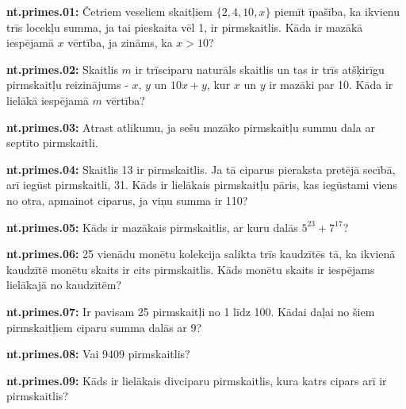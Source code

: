 \documentclass[11pt]{article}
\newenvironment{uzdevums}[1][\unskip]{%
\vspace{3mm}
\noindent
\textbf{#1:}
\noindent}
{}
\begin{document}
\begin{uzdevums}[nt.primes.01]
Četriem veseliem skaitļiem $\{2,4,10,x\}$ piemīt īpašība, ka ikvienu trīs locekļu summa, ja tai pieskaita vēl 1, ir pirmskaitlis. 
Kāda ir mazākā iespējamā $x$ vērtība, ja zināms, ka $x > 10$?  
\end{uzdevums}

\begin{uzdevums}[nt.primes.02]
Skaitlis $m$ ir trīsciparu naturāls skaitlis un tas ir trīs atšķirīgu pirmskaitļu reizinājums - $x$, $y$ un $10x+y$, 
kur $x$ un $y$ ir mazāki par 10. Kāda ir lielākā iespējamā $m$ vērtība?
\end{uzdevums}

\begin{uzdevums}[nt.primes.03]
Atrast atlikumu, ja sešu mazāko pirmskaitļu summu dala ar septīto pirmskaitli. 
\end{uzdevums}

\begin{uzdevums}[nt.primes.04]
Skaitlis 13 ir pirmskaitlis. Ja tā ciparus pieraksta pretējā secībā, arī iegūst pirmskaitli, 31. Kāds ir lielākais pirmskaitļu 
pāris, kas iegūstami viens no otra, apmainot ciparus, ja viņu summa ir 110? 
\end{uzdevums}

\begin{uzdevums}[nt.primes.05]
Kāds ir mazākais pirmskaitlis, ar kuru dalās $5^{23} + 7^{17}$?
\end{uzdevums}

\begin{uzdevums}[nt.primes.06]
25 vienādu monētu kolekcija salikta trīs kaudzītēs tā, ka ikvienā kaudzītē monētu skaits ir cits pirmskaitlis. Kāds monētu 
skaits ir iespējams lielākajā no kaudzītēm? 
\end{uzdevums}

\begin{uzdevums}[nt.primes.07]
Ir pavisam 25 pirmskaitļi no 1 līdz 100. Kādai daļai no šiem pirmskaitļiem ciparu summa dalās ar 9?
\end{uzdevums}

\begin{uzdevums}[nt.primes.08]
Vai 9409 pirmskaitlis?
\end{uzdevums}

\begin{uzdevums}[nt.primes.09]
Kāds ir lielākais divciparu pirmskaitlis, kura katrs cipars arī ir pirmskaitlis?
\end{uzdevums}
\end{document}
